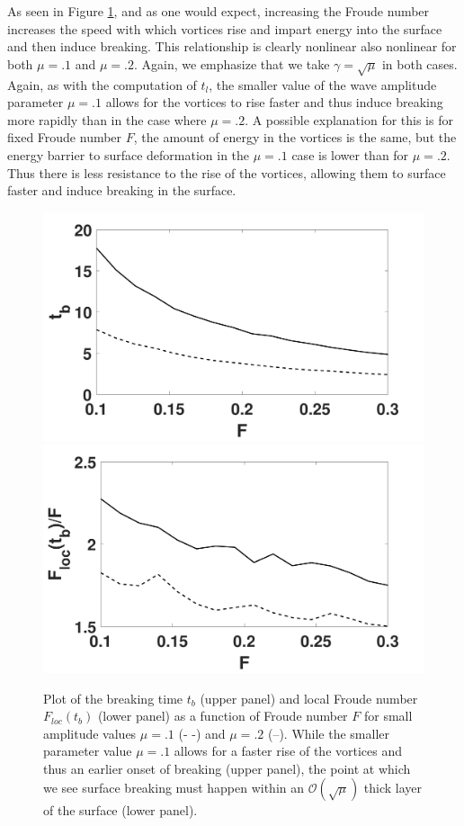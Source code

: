 \documentclass[a4paper,11pt]{article}
\begin{document}
As seen in Figure \ref{fig:froudecomp}, and as one would expect, increasing the Froude number increases the speed with which vortices rise and impart energy into the surface and then induce breaking.  This relationship is clearly nonlinear also nonlinear for both $\mu=.1$ and $\mu=.2$.  Again, we emphasize that we take $\gamma = \sqrt{\mu}$ in both cases.  Again, as with the computation of $t_{l}$, the smaller value of the wave amplitude parameter $\mu=.1$ allows for the vortices to rise faster and thus induce breaking more rapidly than in the case where $\mu=.2$.   A possible explanation for this is for fixed Froude number $F$, the amount of energy in the vortices is the same, but the energy barrier to surface deformation in the $\mu=.1$ case is lower than for $\mu=.2$.  Thus there is less resistance to the rise of the vortices, allowing them to surface faster and induce breaking in the surface.  
\begin{figure}[!h]
\centering
\includegraphics[width=.6\textwidth]{froude_comp_pm}
\includegraphics[width=.6\textwidth]{froude_loc_pm}
\caption{Plot of the breaking time $t_{b}$ (upper panel) and local Froude number $F_{loc}(t_{b})$ (lower panel) as a function of Froude number $F$ for small amplitude values $\mu=.1$ (- -) and $\mu=.2$ (--). While the smaller parameter value $\mu=.1$ allows for a faster rise of the vortices and thus an earlier onset of breaking (upper panel), the point at which we see surface breaking must happen within an $\mathcal{O}(\sqrt{\mu})$ thick layer of the surface (lower panel). }
\label{fig:froudecomp}
\end{figure}
\end{document}
